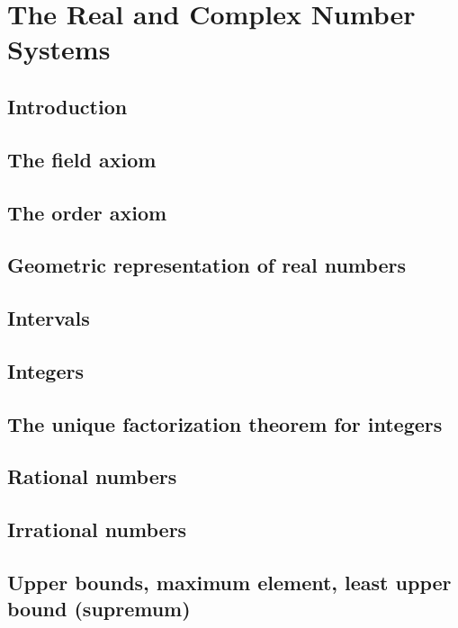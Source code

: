 \documentclass[class=mike-apostol-mathematical-analysis,crop=false]{standalone}
\begin{document}
\chapter{The Real and Complex Number Systems}

\section{Introduction}

\section{The field axiom}

\section{The order axiom}

\section{Geometric representation of real numbers}

\section{Intervals}

\section{Integers}

\section{The unique factorization theorem for integers}

\section{Rational numbers}

\section{Irrational numbers}

\section{Upper bounds, maximum element, least upper bound (supremum)}
\end{document}

